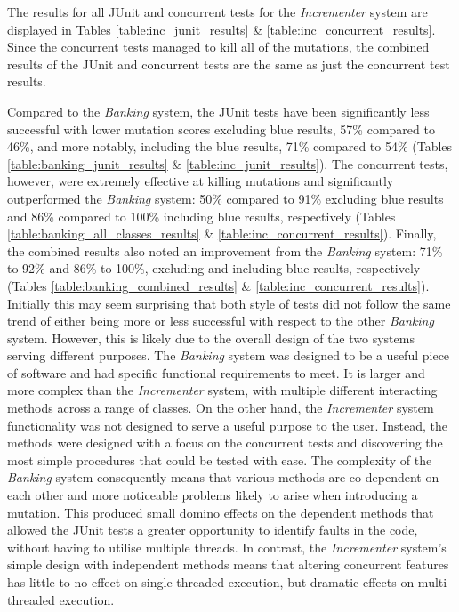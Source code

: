 \documentclass[a4paper,12pt]{article}
\begin{document}
The results for all JUnit and concurrent tests for the \textit{Incrementer} system are displayed in Tables \ref{table:inc_junit_results} \& \ref{table:inc_concurrent_results}. Since the concurrent tests managed to kill all of the mutations, the combined results of the JUnit and concurrent tests are the same as just the concurrent test results.

Compared to the \textit{Banking} system, the JUnit tests have been significantly less successful with lower mutation scores excluding blue results, 57\% compared to 46\%, and more notably, including the blue results, 71\% compared to 54\% (Tables \ref{table:banking_junit_results} \& \ref{table:inc_junit_results}). The concurrent tests, however, were extremely effective at killing mutations and significantly outperformed the \textit{Banking} system: 50\% compared to 91\% excluding blue results and 86\% compared to 100\% including blue results, respectively (Tables \ref{table:banking_all_classes_results} \& \ref{table:inc_concurrent_results}). Finally, the combined results also noted an improvement from the \textit{Banking} system: 71\% to 92\% and 86\% to 100\%, excluding and including blue results, respectively (Tables \ref{table:banking_combined_results} \& \ref{table:inc_concurrent_results}). Initially this may seem surprising that both style of tests did not follow the same trend of either being more or less successful with respect to the other \textit{Banking} system. However, this is likely due to the overall design of the two systems serving different purposes. The \textit{Banking} system was designed to be a useful piece of software and had specific functional requirements to meet. It is larger and more complex than the \textit{Incrementer} system, with multiple different interacting methods across a range of classes. On the other hand, the \textit{Incrementer} system functionality was not designed to serve a useful purpose to the user. Instead, the methods were designed with a focus on the concurrent tests and discovering the most simple procedures that could be tested with ease. The complexity of the \textit{Banking} system consequently means that various methods are co-dependent on each other and more noticeable problems likely to arise when introducing a mutation. This produced small domino effects on the dependent methods that allowed the JUnit tests a greater opportunity to identify faults in the code, without having to utilise multiple threads. In contrast, the \textit{Incrementer} system's simple design with independent methods means that altering concurrent features has little to no effect on single threaded execution, but dramatic effects on multi-threaded execution. 
\end{document}
